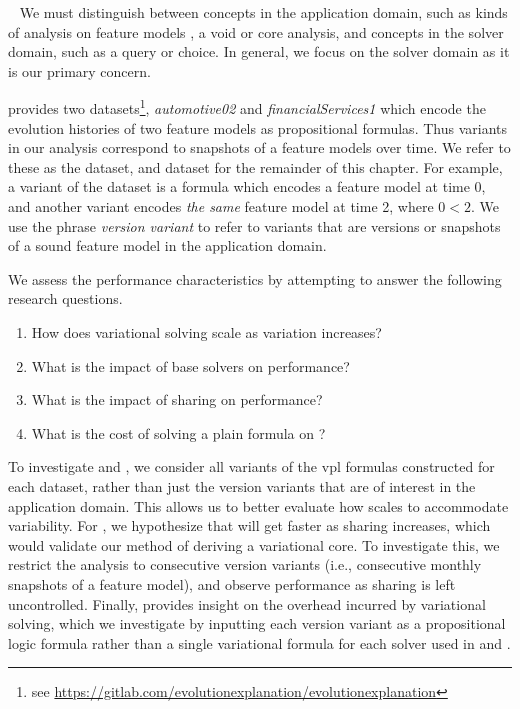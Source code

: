 ~\label{section:case-studies:experimental-methodology}
%
We must distinguish between concepts in the application domain, such as kinds of
analysis on feature models \eg{}, a void or core analysis, and concepts in the
solver domain, such as a query or choice. In general, we focus on the solver
domain as it is our primary concern.

\nieke{} provides two datasets\footnote{see
  \url{https://gitlab.com/evolutionexplanation/evolutionexplanation}},
\textit{automotive02} and \textit{financialServices1} which encode the evolution
histories of two feature models as propositional formulas. Thus variants in our
analysis correspond to snapshots of a feature models over time. We refer to
these as the \auto{} dataset, and \fin{} dataset for the remainder of this
chapter. For example, a variant of the \auto{} dataset is a \pl{} formula which
encodes a feature model at time 0, and another variant encodes \emph{the same}
feature model at time 2, where $0 < 2$. We use the phrase \textit{version
  variant} to refer to variants that are versions or snapshots of a sound
feature model in the application domain.

We assess the performance characteristics \vsat{} by attempting to answer the
following research questions.
%
\begin{enumerate}%
\item[\resQ{1}] How does variational solving scale as variation increases?
\item[\resQ{2}] What is the impact of base solvers on performance?
\item[\resQ{3}] What is the impact of sharing on performance?
\item[\resQ{4}] What is the cost of solving a plain formula on \vsat{}?
\end{enumerate}

To investigate  and , we consider all variants of the \ac{vpl}
formulas constructed for each dataset, rather than just the version variants
that are of interest in the application domain. This allows us to better
evaluate how \vsat{} scales to accommodate variability.
%
For , we hypothesize that \vsat{} will get faster as sharing increases,
which would validate our method of deriving a variational core. To investigate
this, we restrict the analysis to consecutive version variants (i.e.,
consecutive monthly snapshots of a feature model), and observe performance
as sharing is left uncontrolled.
%
Finally,  provides insight on the overhead incurred by variational
solving, which we investigate by inputting each version variant as a
propositional logic formula rather than a single variational formula for each
solver used in  and .

